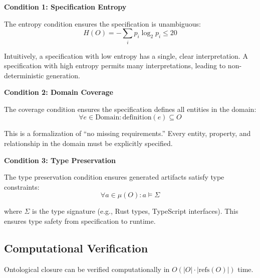 \textbf{Condition 1: Specification Entropy}

The entropy condition ensures the specification is unambiguous:
\begin{equation}
    H(O) = -\sum_{i} p_i \log_2 p_i \leq 20
\end{equation}

Intuitively, a specification with low entropy has a single, clear interpretation. A specification with high entropy permits many interpretations, leading to non-deterministic generation.

\textbf{Condition 2: Domain Coverage}

The coverage condition ensures the specification defines all entities in the domain:
\begin{equation}
    \forall e \in \text{Domain}: \text{definition}(e) \subseteq O
\end{equation}

This is a formalization of ``no missing requirements.'' Every entity, property, and relationship in the domain must be explicitly specified.

\textbf{Condition 3: Type Preservation}

The type preservation condition ensures generated artifacts satisfy type constraints:
\begin{equation}
    \forall a \in \mu(O): a \models \Sigma
\end{equation}

where \(\Sigma\) is the type signature (e.g., Rust types, TypeScript interfaces). This ensures type safety from specification to runtime.

\subsection{Computational Verification}

\begin{theorem}
    Ontological closure can be verified computationally in \(O(|O| \cdot |\text{refs}(O)|)\) time.
\end{theorem}


